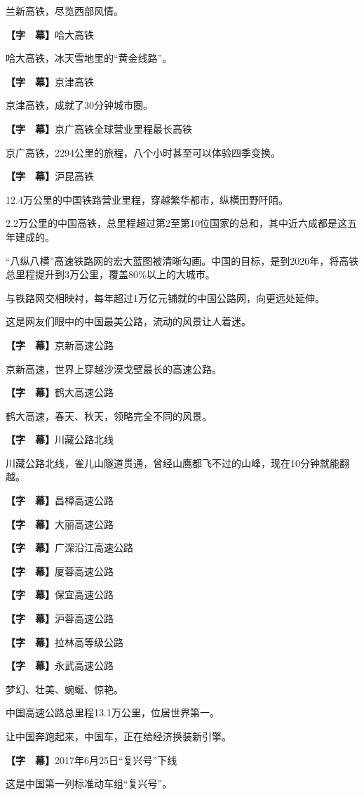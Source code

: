 \documentclass{ctexart}
\newcommand{\zkh}[1]{\textbf{\hspace{-2.7em} 【#1】}}
\begin{document}
 兰新高铁，尽览西部风情。

 \zkh{字　幕}哈大高铁

 哈大高铁，冰天雪地里的``黄金线路''。

 \zkh{字　幕}京津高铁

 京津高铁，成就了30分钟城市圈。

 \zkh{字　幕}京广高铁全球营业里程最长高铁

 京广高铁，2294公里的旅程，八个小时甚至可以体验四季变换。

 \zkh{字　幕}沪昆高铁

 12.4万公里的中国铁路营业里程，穿越繁华都市，纵横田野阡陌。

2.2万公里的中国高铁，总里程超过第2至第10位国家的总和，其中近六成都是这五年建成的。

``八纵八横''高速铁路网的宏大蓝图被清晰勾画。中国的目标，是到2020年，将高铁总里程提升到3万公里，覆盖80{\%}以上的大城市。

 与铁路网交相映衬，每年超过1万亿元铺就的中国公路网，向更远处延伸。

 这是网友们眼中的中国最美公路，流动的风景让人着迷。

 \zkh{字　幕}京新高速公路

 京新高速，世界上穿越沙漠戈壁最长的高速公路。

 \zkh{字　幕}鹤大高速公路

 鹤大高速，春天、秋天，领略完全不同的风景。

 \zkh{字　幕}川藏公路北线

 
川藏公路北线，雀儿山隧道贯通，曾经山鹰都飞不过的山峰，现在10分钟就能翻越。

 \zkh{字　幕}昌樟高速公路

 \zkh{字　幕}大丽高速公路

 \zkh{字　幕}广深沿江高速公路

 \zkh{字　幕}厦蓉高速公路

 \zkh{字　幕}保宜高速公路

 \zkh{字　幕}沪蓉高速公路

 \zkh{字　幕}拉林高等级公路

 \zkh{字　幕}永武高速公路

 梦幻、壮美、蜿蜒、惊艳。

 中国高速公路总里程13.1万公里，位居世界第一。

 让中国奔跑起来，中国车，正在给经济换装新引擎。

 \zkh{字　幕}2017年6月25日``复兴号''下线

 这是中国第一列标准动车组``复兴号''。
\end{document}
